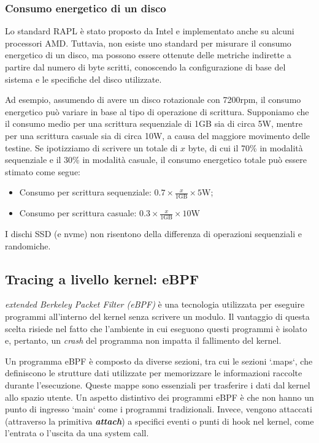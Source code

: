 \documentclass{article}
\begin{document}
\subsubsection{Consumo energetico di un disco}
Lo standard RAPL è stato proposto da Intel e implementato anche su alcuni processori AMD. Tuttavia, non esiste uno standard per misurare il consumo energetico di un disco, ma possono essere ottenute delle metriche indirette a partire dal numero di byte scritti, conoscendo la configurazione di base del sistema e le specifiche del disco utilizzate.

Ad esempio, assumendo di avere un disco rotazionale con 7200rpm, il consumo energetico può variare in base al tipo di operazione di scrittura. Supponiamo che il consumo medio per una scrittura sequenziale di 1GB sia di circa 5W, mentre per una scrittura casuale sia di circa 10W, a causa del maggiore movimento delle testine. Se ipotizziamo di scrivere un totale di \(x\) byte, di cui il 70\% in modalità sequenziale e il 30\% in modalità casuale, il consumo energetico totale può essere stimato come segue:

\begin{itemize}
  \item Consumo per scrittura sequenziale: \(0.7 \times \frac{x}{1 \text{GB}} \times 5 \text{W}\);
  \item Consumo per scrittura casuale: \(0.3 \times \frac{x}{1 \text{GB}} \times 10 \text{W}\)
\end{itemize}

I dischi SSD (e nvme) non risentono della differenza di operazioni sequenziali e randomiche.

\subsection{Tracing a livello kernel: eBPF}
\emph{extended Berkeley Packet Filter (eBPF)} è una tecnologia utilizzata per eseguire programmi all'interno del kernel senza scrivere un modulo. Il vantaggio di questa scelta risiede nel fatto che l'ambiente in cui eseguono questi programmi è isolato e, pertanto, un \textit{crash} del programma non impatta il fallimento del kernel.

Un programma eBPF è composto da diverse sezioni, tra cui le sezioni `.maps`, che definiscono le strutture dati utilizzate per memorizzare le informazioni raccolte durante l'esecuzione. Queste mappe sono essenziali per trasferire i dati dal kernel allo spazio utente. Un aspetto distintivo dei programmi eBPF è che non hanno un punto di ingresso `main` come i programmi tradizionali. Invece, vengono attaccati (attraverso la primitiva \textbf{\textit{attach}}) a specifici eventi o punti di hook nel kernel, come l'entrata o l'uscita da una system call.
\end{document}
